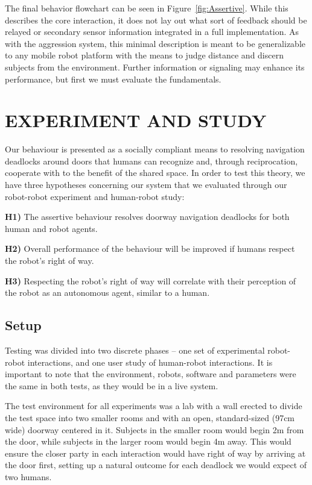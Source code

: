 \documentclass[letterpaper, 10 pt, conference]{ieeeconf}  %
\begin{document}
The final behavior flowchart can be seen in Figure~\ref{fig:Assertive}. While this describes the core interaction, it does not lay out what sort of feedback should be relayed or secondary sensor information integrated in a full implementation. As with the aggression system, this minimal description is meant to be generalizable to any mobile robot platform with the means to judge distance and discern subjects from the environment. Further information or signaling may enhance its performance, but first we must evaluate the fundamentals.


\section{EXPERIMENT AND STUDY}

Our behaviour is presented as a socially compliant means to resolving navigation deadlocks around doors that humans can recognize and, through reciprocation, cooperate with to the benefit of the shared space. In order to test this theory, we have three hypotheses concerning our system that we evaluated through our robot-robot experiment and human-robot study:

\textbf{H1)} The assertive behaviour resolves doorway navigation deadlocks for both human and robot agents.

\textbf{H2)} Overall performance of the behaviour will be improved if humans respect the robot's right of way.

\textbf{H3)} Respecting the robot's right of way will correlate with their perception of the robot as an autonomous agent, similar to a human.


\subsection{Setup}

Testing was divided into two discrete phases – one set of experimental robot-robot interactions, and one user study of human-robot interactions. It is important to note that the environment, robots, software and parameters were the same in both tests, as they would be in a live system.

The test environment for all experiments was a lab with a wall erected to divide the test space into two smaller rooms and with an open, standard-sized (97cm wide) doorway centered in it. Subjects in the smaller room would begin 2m from the door, while subjects in the larger room would begin 4m away. This would ensure the closer party in each interaction would have right of way by arriving at the door first, setting up a natural outcome for each deadlock we would expect of two humans.
\end{document}
